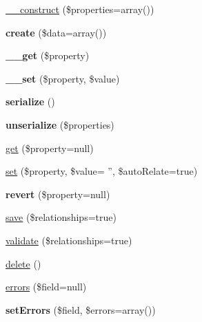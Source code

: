 \begin{DoxyCompactItemize}
\item 
\hyperlink{classModel_a2e7e7681f2274b6b4c75afc8c8337147}{\_\-\_\-construct} (\$properties=array())
\item 
\hypertarget{classModel_affd04e1cae18cb61d1e219f5283eab35}{
{\bfseries create} (\$data=array())}
\label{classModel_affd04e1cae18cb61d1e219f5283eab35}

\item 
\hypertarget{classModel_a2f8ccba937b5f46ec24de1d473d7a8c2}{
{\bfseries \_\-\_\-get} (\$property)}
\label{classModel_a2f8ccba937b5f46ec24de1d473d7a8c2}

\item 
\hypertarget{classModel_a091cb63bb312f09b9ae8c6d49785e5dc}{
{\bfseries \_\-\_\-set} (\$property, \$value)}
\label{classModel_a091cb63bb312f09b9ae8c6d49785e5dc}

\item 
\hypertarget{classModel_a053565f875759519ec67550978c609be}{
{\bfseries serialize} ()}
\label{classModel_a053565f875759519ec67550978c609be}

\item 
\hypertarget{classModel_afad9b0b1f966a199acf03ddc2e7d6f2d}{
{\bfseries unserialize} (\$properties)}
\label{classModel_afad9b0b1f966a199acf03ddc2e7d6f2d}

\item 
\hyperlink{classModel_aac90fab22955257f7bb6bde27d0e01db}{get} (\$property=null)
\item 
\hyperlink{classModel_a69d22c532687c1fa41274c25da4b7c30}{set} (\$property, \$value= '', \$autoRelate=true)
\item 
\hypertarget{classModel_abf3248107ca60f4e1c8d89b94cb0fc62}{
{\bfseries revert} (\$property=null)}
\label{classModel_abf3248107ca60f4e1c8d89b94cb0fc62}

\item 
\hyperlink{classModel_a61131879ca51e77e5cad6329d08d9bdd}{save} (\$relationships=true)
\item 
\hyperlink{classModel_ac49ef0328b0d46dda63c5ae5e125ec30}{validate} (\$relationships=true)
\item 
\hyperlink{classModel_af55cc78d20b12b64bb6f584496a60a52}{delete} ()
\item 
\hyperlink{classModel_a52104bbbd42f14befcc6f38d37f0445f}{errors} (\$field=null)
\item 
\hypertarget{classModel_ad6eca2beb84492a5830c8c2d6c804982}{
{\bfseries setErrors} (\$field, \$errors=array())}
\label{classModel_ad6eca2beb84492a5830c8c2d6c804982}


\end{DoxyCompactItemize}
